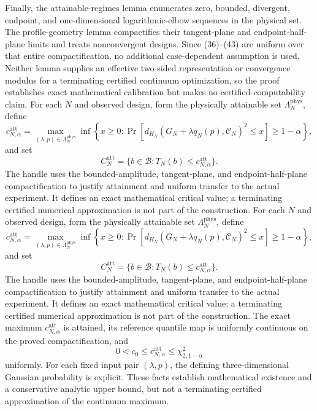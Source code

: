 Finally, the attainable-regimes lemma enumerates zero, bounded, divergent, endpoint, and one-dimensional logarithmic-elbow sequences in the physical set.  The profile-geometry lemma compactifies their tangent-plane and endpoint-half-plane limits and treats nonconvergent designs.  Since (36)--(43) are uniform over that entire compactification, no additional case-dependent assumption is used.  Neither lemma supplies an effective two-sided representation or convergence modulus for a terminating certified continuum optimization, so the proof establishes exact mathematical calibration but makes no certified-computability claim.
For each \(N\) and observed design, form the physically attainable set \(\Lambda_N^{\mathrm{phys}}\), define
\[
c_{N,\alpha}^{\mathrm{att}}
=\max_{(\lambda,p)\in\Lambda_N^{\mathrm{phys}}}
\inf\!\left\{x\ge0:
\Pr\!\left[d_{H_N}(G_N+\lambda q_N(p),\mathcal C_N)^2\le x\right]
\ge1-\alpha\right\},
\]
and set
\[
C_N^{\mathrm{att}}=\{b\in\mathcal B:T_N(b)\le c_{N,\alpha}^{\mathrm{att}}\}.
\]
The handle uses the bounded-amplitude, tangent-plane, and endpoint-half-plane compactification to justify attainment and uniform transfer to the actual experiment.  It defines an exact mathematical critical value; a terminating certified numerical approximation is not part of the construction.
For each \(N\) and observed design, form the physically attainable set \(\Lambda_N^{\mathrm{phys}}\), define
\[
c_{N,\alpha}^{\mathrm{att}}
=\max_{(\lambda,p)\in\Lambda_N^{\mathrm{phys}}}
\inf\!\left\{x\ge0:
\Pr\!\left[d_{H_N}(G_N+\lambda q_N(p),\mathcal C_N)^2\le x\right]
\ge1-\alpha\right\},
\]
and set
\[
C_N^{\mathrm{att}}=\{b\in\mathcal B:T_N(b)\le c_{N,\alpha}^{\mathrm{att}}\}.
\]
The handle uses the bounded-amplitude, tangent-plane, and endpoint-half-plane compactification to justify attainment and uniform transfer to the actual experiment.  It defines an exact mathematical critical value; a terminating certified numerical approximation is not part of the construction.
The exact maximum \(c_{N,\alpha}^{\mathrm{att}}\) is attained, its reference quantile map is uniformly continuous on the proved compactification, and
\[
0<c_0\le c_{N,\alpha}^{\mathrm{att}}\le\chi^2_{2,1-\alpha}
\]
uniformly.  For each fixed input pair \((\lambda,p)\), the defining three-dimensional Gaussian probability is explicit.  These facts establish mathematical existence and a conservative analytic upper bound, but not a terminating certified approximation of the continuum maximum.
